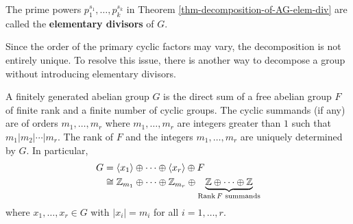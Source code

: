 \begin{definition}
	The prime powers $p_1^{s_1},\dots, p_k^{s_k}$ in Theorem \ref{thm-decomposition-of-AG-elem-div} are called the \textbf{elementary divisors} of $G$.
\end{definition}
Since the order of the primary cyclic factors may vary, the decomposition is not entirely unique. To resolve this issue, there is another way to decompose a group without introducing elementary divisors.
\begin{theorem} \label{thm-decomposition-of-modules-inv-fac}
	A finitely generated abelian group $G$ is the direct sum of a free abelian group $F$ of finite rank and a finite number of
	cyclic  groups. The cyclic  summands (if any) are of orders $m_1,\dots, m_r$ where $m_1,\dots, m_r$ are integers greater than $1$ such that $m_1|m_2|\cdots |m_r$. The rank of $F$ and the integers $m_1,\dots, m_r$ are uniquely determined by $G$. In particular,
	\begin{align*}
		G&= \langle x_1 \rangle\oplus \cdots \oplus \langle x_r \rangle\oplus F\\
		&\cong \mathbb{Z}_{m_1}\oplus \cdots \oplus \mathbb{Z}_{m_r}\oplus \underbrace{\mathbb{Z} \oplus \cdots \oplus \mathbb{Z}}_{\operatorname{Rank}  F \text{ summands}}
	\end{align*}
	where $x_1,\dots, x_r\in G$ with $|x_i| = m_i$ for all $i=1,\dots, r$.
\end{theorem}
